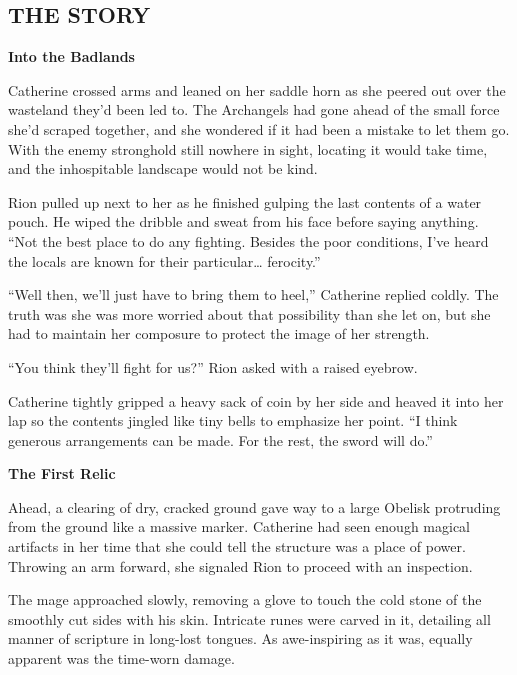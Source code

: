 
\newpage

\begin{multicols*}{2}

\subsection*{\MakeUppercase{The story}}

\textbf{Into the Badlands}

Catherine crossed arms and leaned on her saddle horn as she peered out over the wasteland they'd been led to.
The Archangels had gone ahead of the small force she'd scraped together, and she wondered if it had been a mistake to let them go.
With the enemy stronghold still nowhere in sight, locating it would take time, and the inhospitable landscape would not be kind.

Rion pulled up next to her as he finished gulping the last contents of a water pouch.
He wiped the dribble and sweat from his face before saying anything.
``Not the best place to do any fighting.
Besides the poor conditions, I've heard the locals are known for their particular… ferocity.''

``Well then, we'll just have to bring them to heel,'' Catherine replied coldly.
The truth was she was more worried about that possibility than she let on, but she had to maintain her composure to protect the image of her strength.

``You think they'll fight for us?'' Rion asked with a raised eyebrow.

Catherine tightly gripped a heavy sack of coin by her side and heaved it into her lap so the contents jingled like tiny bells to emphasize her point.
``I think generous arrangements can be made.
For the rest, the sword will do.''

\textbf{The First Relic}

Ahead, a clearing of dry, cracked ground gave way to a large Obelisk protruding from the ground like a massive marker.
Catherine had seen enough magical artifacts in her time that she could tell the structure was a place of power.
Throwing an arm forward, she signaled Rion to proceed with an inspection.

The mage approached slowly, removing a glove to touch the cold stone of the smoothly cut sides with his skin.
Intricate runes were carved in it, detailing all manner of scripture in long-lost tongues.
As awe-inspiring as it was, equally apparent was the time-worn damage.


\end{multicols*}
